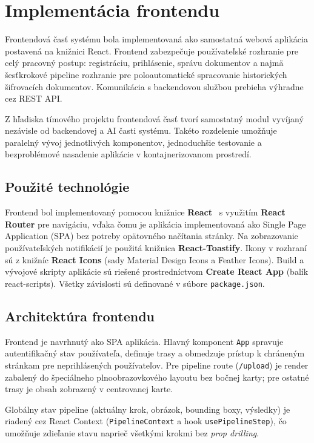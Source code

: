 \section{Implementácia frontendu}

Frontendová časť systému bola implementovaná ako samostatná webová aplikácia postavená na knižnici React. Frontend zabezpečuje používateľské rozhranie pre celý pracovný postup: registráciu, prihlásenie, správu dokumentov a najmä šesťkrokové pipeline rozhranie pre poloautomatické spracovanie historických šifrovacích dokumentov. Komunikácia s backendovou službou prebieha výhradne cez REST API.

Z hľadiska tímového projektu frontendová časť tvorí samostatný modul vyvíjaný nezávisle od backendovej a AI časti systému. Takéto rozdelenie umožňuje paralelný vývoj jednotlivých komponentov, jednoduchšie testovanie a bezproblémové nasadenie aplikácie v kontajnerizovanom prostredí.

\subsection{Použité technológie}

Frontend bol implementovaný pomocou knižnice \textbf{React}~\cite{react} s využitím \textbf{React Router} pre navigáciu, vďaka čomu je aplikácia implementovaná ako Single Page Application (SPA) bez potreby opätovného načítania stránky. Na zobrazovanie používateľských notifikácií je použitá knižnica \textbf{React-Toastify}. Ikony v rozhraní sú z knižníc \textbf{React Icons} (sady Material Design Icons a Feather Icons). Build a vývojové skripty aplikácie sú riešené prostredníctvom \textbf{Create React App} (balík react-scripts). Všetky závislosti sú definované v súbore \texttt{package.json}.

\subsection{Architektúra frontendu}

Frontend je navrhnutý ako SPA aplikácia. Hlavný komponent \texttt{App} spravuje autentifikačný stav používateľa, definuje trasy a obmedzuje prístup k chráneným stránkam pre neprihlásených používateľov. Pre pipeline route (\texttt{/upload}) je render zabalený do špeciálneho plnoobrazovkového layoutu bez bočnej karty; pre ostatné trasy je obsah zobrazený v centrovanej karte.

Globálny stav pipeline (aktuálny krok, obrázok, bounding boxy, výsledky) je riadený cez React Context (\texttt{PipelineContext} a hook \texttt{usePipelineStep}), čo umožňuje zdieľanie stavu naprieč všetkými krokmi bez \textit{prop drilling}.

